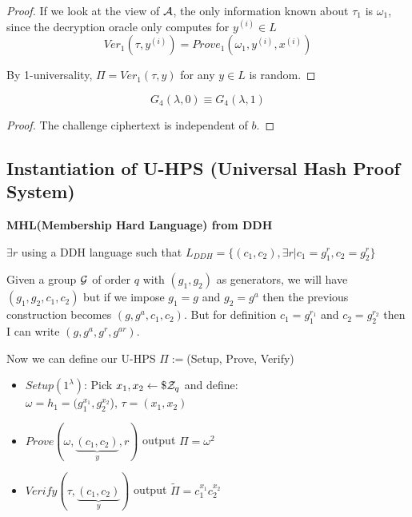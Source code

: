 \begin{proof}
    If we look at the view of $\mathcal{A}$, the only information known about $\tau_{1}$
    is $\omega_{1}$, since the decryption oracle only computes for $y^{(i)} \in
    L$
    \[
        Ver_{1}(\tau, y^{(i)})=Prove_{1}(\omega_{1}, y^{(i)}, x^{(i)})
    \]

    By 1-universality, $\Pi=Ver_{1}(\tau ,y)$ for any $y \in L$ is random.
\end{proof}

\begin{lemma}
    \[
        G_{4}(\lambda, 0)\equiv G_{4}(\lambda, 1)   
    \]
\end{lemma}
\begin{proof}
    The challenge ciphertext is independent of $b$.
\end{proof}






\subsection{Instantiation of U-HPS (Universal Hash Proof System)}
\textbf{MHL(Membership Hard Language) from DDH}

$\exists r$ using a DDH language such that $L_{DDH}=\{(c_1,c_2), \exists r | c_1=g_1^r, c_2=g_2^r\}$

Given a group $\mathcal{G}$ of order $q$ with $(g_1,g_2)$ as generators, we will have $(g_1,g_2,c_1,c_2)$ but if we impose $g_1=g$ and $g_2=g^a$ then the previous construction becomes $(g,g^a,c_1,c_2)$. But for definition $c_1=g_1^{r_1}$ and $c_2=g_2^{r_2}$ then I can write $(g,g^a,g^r,g^{ar})$.

Now we can define our U-HPS $\Pi:=$(Setup, Prove, Verify)

\begin{itemize}
    \item $Setup(1^\lambda)$: Pick $x_1,x_2 \leftarrow\$ \mathcal{Z}_q$ and define:\\ $\omega=h_1=(g_1^{x_1},g_2^{x_2}$), $\tau=(x_1,x_2)$
    \item $Prove(\omega, \underbrace{(c_1,c_2)}_{y}, r)$ output $\Pi=\omega^2$
    \item $Verify(\tau, \underbrace{(c_1,c_2)}_{y})$ output $\widetilde{\Pi}=c_1^{x_1}c_2^{x_2}$ %
\end{itemize}

